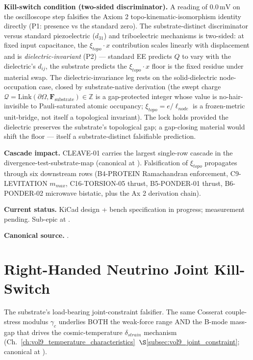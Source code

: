 \textbf{Kill-switch condition (two-sided discriminator).} A reading of $0.0\,\text{mV}$ on the oscilloscope step falsifies the Axiom 2 topo-kinematic-isomorphism identity directly (P1: presence vs the standard zero). The substrate-distinct discriminator versus standard piezoelectric ($d_{31}$) and triboelectric mechanisms is two-sided: at fixed input capacitance, the $\xi_{topo} \cdot x$ contribution scales linearly with displacement and is \emph{dielectric-invariant} (P2) --- standard EE predicts $Q$ to vary with the dielectric's $d_{ij}$, the substrate predicts the $\xi_{topo} \cdot x$ floor is the fixed residue under material swap. The dielectric-invariance leg rests on the solid-dielectric node-occupation case, closed by substrate-native derivation (the swept charge $\mathcal{Q} = \mathrm{Link}(\partial\Omega, \mathbf{F}_{\text{substrate}}) \in \mathbb{Z}$ is a gap-protected integer whose value is no-hair-invisible to Pauli-saturated atomic occupancy; $\xi_{topo} = e/\ell_{node}$ is a frozen-metric unit-bridge, not itself a topological invariant). The lock holds provided the dielectric preserves the substrate's topological gap; a gap-closing material would shift the floor --- itself a substrate-distinct falsifiable prediction.

\textbf{Cascade impact.} CLEAVE-01 carries the largest single-row cascade in the divergence-test-substrate-map (canonical at ). Falsification of $\xi_{topo}$ propagates through six downstream rows (B4-PROTEIN Ramachandran enforcement, C9-LEVITATION $m_{max}$, C16-TORSION-05 thrust, B5-PONDER-01 thrust, B6-PONDER-02 microwave bistatic, plus the Ax 2 derivation chain).

\textbf{Current status.} KiCad design + bench specification in progress; measurement pending. Sub-epic at .

\textbf{Canonical source.} .

\section{Right-Handed Neutrino Joint Kill-Switch}
\label{sec:vol9_neutrino_kill_switch}

The substrate's load-bearing joint-constraint falsifier. The same Cosserat couple-stress modulus $\gamma_c$ underlies BOTH the weak-force range AND the B-mode mass-gap that drives the cosmic-temperature $\delta_{strain}$ mechanism (Ch.~\ref{ch:vol9_temperature_characteristics}~$\S$\ref{subsec:vol9_joint_constraint}; canonical at ).

